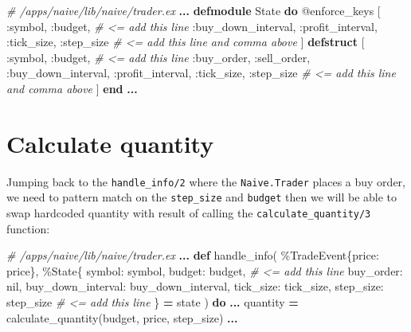 \documentclass[
]{book}
\newenvironment{Shaded}{\begin{snugshade}}{\end{snugshade}}
\newcommand{\CommentTok}[1]{\textcolor[rgb]{0.56,0.35,0.01}{\textit{#1}}}
\newcommand{\ConstantTok}[1]{\textcolor[rgb]{0.00,0.00,0.00}{#1}}
\newcommand{\KeywordTok}[1]{\textcolor[rgb]{0.13,0.29,0.53}{\textbf{#1}}}
\newcommand{\NormalTok}[1]{#1}
\newcommand{\OperatorTok}[1]{\textcolor[rgb]{0.81,0.36,0.00}{\textbf{#1}}}
\newcommand{\OtherTok}[1]{\textcolor[rgb]{0.56,0.35,0.01}{#1}}
\newcommand{\VariableTok}[1]{\textcolor[rgb]{0.00,0.00,0.00}{#1}}
\begin{document}
\begin{Shaded}
\begin{Highlighting}[]
  \CommentTok{\# /apps/naive/lib/naive/trader.ex}
  \OperatorTok{...}
  \KeywordTok{defmodule} \ConstantTok{State} \KeywordTok{do}
    \OtherTok{@enforce\_keys}\NormalTok{ [}
      \VariableTok{:symbol}\NormalTok{,}
      \VariableTok{:budget}\NormalTok{, }\CommentTok{\# \textless{}= add this line}
      \VariableTok{:buy\_down\_interval}\NormalTok{,}
      \VariableTok{:profit\_interval}\NormalTok{,}
      \VariableTok{:tick\_size}\NormalTok{,}
      \VariableTok{:step\_size} \CommentTok{\# \textless{}= add this line and comma above}
\NormalTok{    ]}
    \KeywordTok{defstruct}\NormalTok{ [}
      \VariableTok{:symbol}\NormalTok{,}
      \VariableTok{:budget}\NormalTok{, }\CommentTok{\# \textless{}= add this line}
      \VariableTok{:buy\_order}\NormalTok{,}
      \VariableTok{:sell\_order}\NormalTok{,}
      \VariableTok{:buy\_down\_interval}\NormalTok{,}
      \VariableTok{:profit\_interval}\NormalTok{,}
      \VariableTok{:tick\_size}\NormalTok{,}
      \VariableTok{:step\_size} \CommentTok{\# \textless{}= add this line and comma above}
\NormalTok{    ]}
  \KeywordTok{end}
  \OperatorTok{...}
\end{Highlighting}
\end{Shaded}

\hypertarget{calculate-quantity}{%
\section{Calculate quantity}\label{calculate-quantity}}

Jumping back to the \texttt{handle\_info/2} where the \texttt{Naive.Trader} places a buy order, we need to pattern match on the \texttt{step\_size} and \texttt{budget} then we will be able to swap hardcoded quantity with result of calling the \texttt{calculate\_quantity/3} function:

\begin{Shaded}
\begin{Highlighting}[]
  \CommentTok{\# /apps/naive/lib/naive/trader.ex}
  \OperatorTok{...}
  \KeywordTok{def}\NormalTok{ handle\_info(}
\NormalTok{        \%}\ConstantTok{TradeEvent}\NormalTok{\{}\VariableTok{price:}\NormalTok{ price\},}
\NormalTok{        \%}\ConstantTok{State}\NormalTok{\{}
          \VariableTok{symbol:}\NormalTok{ symbol,}
          \VariableTok{budget:}\NormalTok{ budget, }\CommentTok{\# \textless{}= add this line}
          \VariableTok{buy\_order:} \ConstantTok{nil}\NormalTok{,}
          \VariableTok{buy\_down\_interval:}\NormalTok{ buy\_down\_interval,}
          \VariableTok{tick\_size:}\NormalTok{ tick\_size,}
          \VariableTok{step\_size:}\NormalTok{ step\_size }\CommentTok{\# \textless{}= add this line}
\NormalTok{        \} }\OperatorTok{=}\NormalTok{ state}
\NormalTok{      ) }\KeywordTok{do}
    \OperatorTok{...}
\NormalTok{    quantity }\OperatorTok{=}\NormalTok{ calculate\_quantity(budget, price, step\_size)}
    \OperatorTok{...}
\end{Highlighting}
\end{Shaded}
\end{document}
